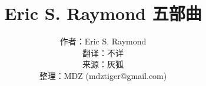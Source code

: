 \documentclass[10pt,a4paper]{article}
\title{Eric S. Raymond 五部曲}
\author{作者：Eric S. Raymond\\
翻译：不详\\
来源：灰狐\\
整理：MDZ (mdztiger@gmail.com)}
\begin{document}
\maketitle
\newpage



\newpage
\tableofcontents
\newpage
\setlength{\baselineskip}{13pt} %
\renewcommand{\arraystretch}{1.5}


\newpage


\newpage


\newpage


\newpage


\end{document}
